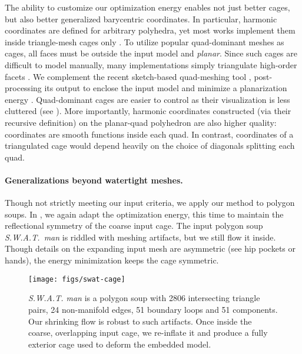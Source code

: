 The ability to customize our optimization energy enables not just better cages,
but also better generalized barycentric coordinates. In particular, harmonic
coordinates are defined for arbitrary polyhedra, yet most works implement them
inside triangle-mesh cages only \cite{HarmonicCoodinates07}.
%
To utilize popular quad-dominant meshes as cages, all faces must be outside the
input model and \emph{planar}.
%
Since such cages are difficult to model manually, many implementations simply
triangulate high-order facets \cite{HarmonicCoodinates07}.
%
We complement the recent sketch-based quad-meshing tool \cite{Takayama:2013},
post-processing its output to enclose the input model and minimize a
planarization energy \cite{poranne2013interactive}.
%
Quad-dominant cages are easier to control as their visualization is less
cluttered (see ).
%
More importantly, harmonic coordinates constructed (via their recursive
definition) on the planar-quad polyhedron are also higher quality: coordinates
are smooth functions inside each quad.
%
In contrast, coordinates of a triangulated cage would depend heavily on the
choice of diagonals splitting each quad.

\paragraph{Generalizations beyond watertight meshes.}
%
Though not strictly meeting our input criteria, we apply our method to
polygon soups. %
%
In , we again adapt the optimization energy, this time to
maintain the reflectional symmetry of the coarse input cage.
%
The input polygon soup \emph{S.W.A.T.\ man} is riddled with meshing artifacts,
but we still flow it inside.
%
Though details on the expanding input mesh are asymmetric (see hip pockets or
hands), the energy minimization keeps the cage symmetric.
%
%

\begin{figure}
  \texttt{[image: figs/swat-cage]}
  \caption{\emph{S.W.A.T. man} is a polygon soup with 2806 
  intersecting triangle pairs, 24 non-manifold edges, 51 boundary loops and 51
  components. Our shrinking flow is robust to such artifacts. Once
  inside the coarse, overlapping input cage, we re-inflate it and produce a
  fully exterior cage used to deform the embedded model.}
  \label{fig:swat-cage}
\end{figure}
